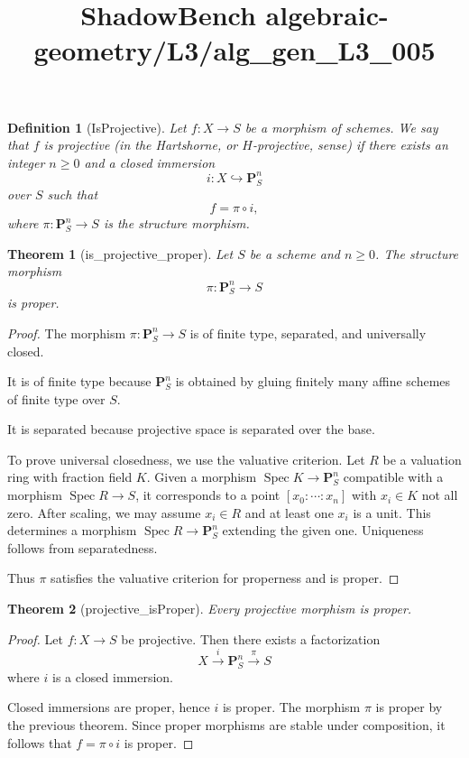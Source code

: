\documentclass{article}
\title{ShadowBench algebraic-geometry/L3/alg\_gen\_L3\_005}
\newtheorem{theorem}{Theorem}
\newtheorem{definition}{Definition}
\begin{document}
\maketitle

\begin{definition}[IsProjective]
Let $f : X \to S$ be a morphism of schemes. We say that $f$ is \emph{projective} (in the Hartshorne, or $H$-projective, sense) if there exists an integer $n \ge 0$ and a closed immersion
\[
i : X \hookrightarrow \mathbf{P}^n_S
\]
over $S$ such that
\[
f = \pi \circ i,
\]
where $\pi : \mathbf{P}^n_S \to S$ is the structure morphism.
\end{definition}

\begin{theorem}[is_projective_proper]
Let $S$ be a scheme and $n \ge 0$. The structure morphism
\[
\pi : \mathbf{P}^n_S \to S
\]
is proper.
\end{theorem}

\begin{proof}
The morphism $\pi : \mathbf{P}^n_S \to S$ is of finite type, separated, and universally closed.

It is of finite type because $\mathbf{P}^n_S$ is obtained by gluing finitely many affine schemes of finite type over $S$.

It is separated because projective space is separated over the base.

To prove universal closedness, we use the valuative criterion. Let $R$ be a valuation ring with fraction field $K$. Given a morphism $\operatorname{Spec} K \to \mathbf{P}^n_S$ compatible with a morphism $\operatorname{Spec} R \to S$, it corresponds to a point $[x_0 : \cdots : x_n]$ with $x_i \in K$ not all zero. After scaling, we may assume $x_i \in R$ and at least one $x_i$ is a unit. This determines a morphism $\operatorname{Spec} R \to \mathbf{P}^n_S$ extending the given one. Uniqueness follows from separatedness.

Thus $\pi$ satisfies the valuative criterion for properness and is proper.
\end{proof}

\begin{theorem}[projective_isProper]
Every projective morphism is proper.
\end{theorem}

\begin{proof}
Let $f : X \to S$ be projective. Then there exists a factorization
\[
X \xrightarrow{i} \mathbf{P}^n_S \xrightarrow{\pi} S
\]
where $i$ is a closed immersion.

Closed immersions are proper, hence $i$ is proper. The morphism $\pi$ is proper by the previous theorem. Since proper morphisms are stable under composition, it follows that $f = \pi \circ i$ is proper.
\end{proof}
\end{document}
